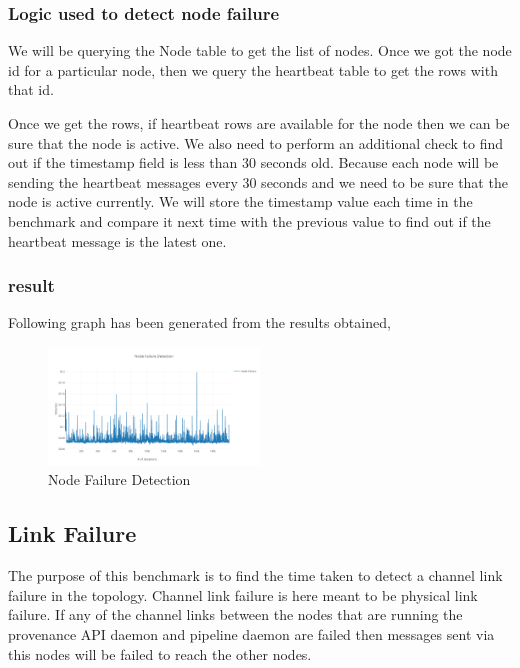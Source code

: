 \subsubsection{Logic used to detect node failure}

We will be querying the Node table to get the list of nodes. Once we got the node id for a particular node, then we query the heartbeat table to get the rows with that id.

Once we get the rows, if heartbeat rows are available for the node then we can be sure that the node is active. We also need to perform an additional check to find out if the timestamp field is less than 30 seconds old. Because each node will be sending the heartbeat messages every 30 seconds and we need to be sure that the node is active currently. We will store the timestamp value each time in the benchmark and compare it next time with the previous value to find out if the heartbeat message is the latest one.

\subsubsection{result}

Following graph has been generated from the results obtained,

\begin{figure}[H]
	\center
	\includegraphics[width=0.5\textwidth]{figures/benchmark_node.png}
	\caption{Node Failure Detection}
	\label{fig:benchmark_node}
\end{figure}

\subsection{Link Failure}

The purpose of this benchmark is to find the time taken to detect a channel link failure in the topology. Channel link failure is here meant to be physical link failure. If any of the channel links between the nodes that are running the provenance API daemon and pipeline daemon are failed then messages sent via this nodes will be failed to reach the other nodes.


